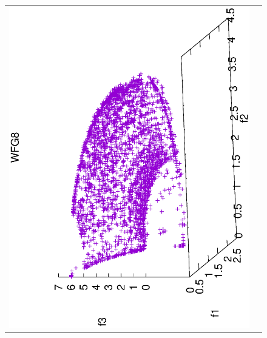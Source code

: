 \begin{figure}[H]
\begin{tabular}{cc}
  \includegraphics[scale=0.3, angle=-90,origin=c]{Figures_Chapter7/Results_Chapter4/Summary_Representative/VSD-MOEA/WFG8.eps} &

\end{tabular}
\end{figure}
